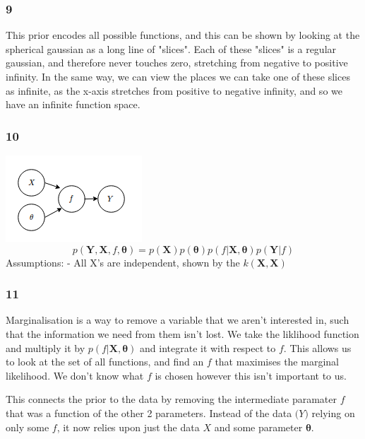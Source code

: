 \documentclass[11pt]{article}
\makeatletter
\def\maxwidth{\ifdim\Gin@nat@width>\linewidth\linewidth
    \else\Gin@nat@width\fi}
\let\Oldincludegraphics\includegraphics
\renewcommand{\includegraphics}[1]{\Oldincludegraphics[width=.8\maxwidth]{#1}}
\makeatother
\begin{document}
    \subsubsection*{9}\label{section}

This prior encodes all possible functions, and this can be shown by
looking at the spherical gaussian as a long line of "slices". Each of
these "slices" is a regular gaussian, and therefore never touches zero,
stretching from negative to positive infinity. In the same way, we can
view the places we can take one of these slices as infinite, as the
x-axis stretches from positive to negative infinity, and so we have an
infinite function space.

    \subsubsection*{10}\label{section}

\includegraphics{q10.png}
\[p(\boldsymbol{Y}, \boldsymbol{X}, f, \boldsymbol{\theta}) = p(\boldsymbol{X}) p(\boldsymbol{\theta}) p(f|\boldsymbol{X},\boldsymbol{\theta})p(\boldsymbol{Y}|f)\]
Assumptions: - All X's are independent, shown by the
\(k(\pmb X, \pmb X)\)

    \subsubsection*{11}\label{section}

Marginalisation is a way to remove a variable that we aren't interested
in, such that the information we need from them isn't lost. We take the
liklihood function and multiply it by
\(p(f|\boldsymbol{X},\boldsymbol{\theta})\) and integrate it with
respect to \(f\). This allows us to look at the set of all functions,
and find an \(f\) that maximises the marginal likelihood. We don't know
what \(f\) is chosen however this isn't important to us.

This connects the prior to the data by removing the intermediate
paramater \(f\) that was a function of the other 2 parameters. Instead
of the data \(\boldsymbol(Y)\) relying on only some \(f\), it now relies
upon just the data \(X\) and some parameter \(\boldsymbol{\theta}\).
\end{document}
